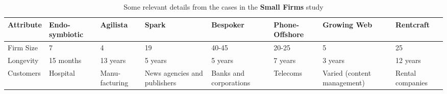 \begin{landscape}
\begin{table}[tbp]
\caption{\label{tab:SmallFirmsDetails} Some relevant details from the cases in the \textbf{Small Firms} study}
\centering
\footnotesize{\begin{tabular}{p{2.3cm}p{2.3cm}p{2.3cm}p{2.3cm}p{2.3cm}p{2.3cm}p{2.3cm}p{2.3cm}}
\hline \hline
\vspace{0.5pt} \bfseries Attribute & \vspace{0.5pt} \bfseries Endo-symbiotic & \vspace{0.5pt} \bfseries Agilista & \vspace{0.5pt} \bfseries Spark & \vspace{0.5pt} \bfseries Bespoker & \vspace{0.5pt} \bfseries Phone-Offshore & \vspace{0.5pt} \bfseries Growing Web & \vspace{0.5pt} \bfseries Rentcraft \\
\hline
\vspace{0.5pt} Firm Size & \vspace{0.5pt} 7 & \vspace{0.5pt} 4 & \vspace{0.5pt} 19 & \vspace{0.5pt} 40-45 & \vspace{0.5pt} 20-25 & \vspace{0.5pt} 5 & \vspace{0.5pt} 25 \\
\hline
\vspace{0.5pt} Longevity & \vspace{0.5pt} 15 months & \vspace{0.5pt} 13 years & \vspace{0.5pt} 5 years & \vspace{0.5pt} 5 years & \vspace{0.5pt} 7 years & \vspace{0.5pt} 3 years & \vspace{0.5pt} 12 years \\
\hline
\vspace{0.5pt} Customers & \vspace{0.5pt} Hospital & \vspace{0.5pt} Manu-facturing & \vspace{0.5pt} News agencies and publishers & \vspace{0.5pt} Banks and corporations & \vspace{0.5pt} Telecoms & \vspace{0.5pt} Varied (content management) & \vspace{0.5pt} Rental companies \\

\end{tabular}}
\end{table}
\end{landscape}
